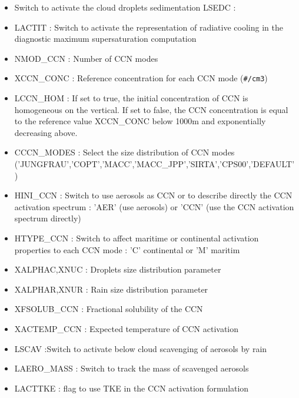\begin{itemize}
\item
{}
Switch to activate the cloud droplets sedimentation
LSEDC : 
\item
{}
LACTIT : Switch to activate the representation of radiative cooling in the diagnostic maximum supersaturation computation
\item
{}
NMOD\_CCN : Number of CCN modes
\item
{}
XCCN\_CONC : Reference concentration for each CCN mode (\verb?#/cm3?)
\item
{}
LCCN\_HOM : If set to true, the initial concentration of CCN is homogeneous on the vertical. If set to false, the CCN concentration is equal to the reference value XCCN\_CONC below 1000m and exponentially decreasing above.
\item
{}
CCCN\_MODES : Select the size distribution of CCN modes ('JUNGFRAU','COPT','MACC','MACC\_JPP','SIRTA','CPS00','DEFAULT')
\item
{}
HINI\_CCN : Switch to use aerosols as CCN or to describe directly the CCN activation spectrum : 'AER' (use aerosols) or 'CCN' (use the CCN activation spectrum directly)
\item
{}
HTYPE\_CCN : Switch to affect maritime or continental activation properties to each CCN mode : 'C' continental or 'M' maritim
\item
{}
XALPHAC,XNUC : Droplets size distribution parameter
\item
{}
XALPHAR,XNUR : Rain size distribution parameter
\item
{}
XFSOLUB\_CCN : Fractional solubility of the CCN
\item
{}
XACTEMP\_CCN : Expected temperature of CCN activation
\item
{}
LSCAV :Switch to activate below cloud scavenging of aerosols by rain
\item
{}
LAERO\_MASS : Switch to track the mass of scavenged aerosols
\item LACTTKE :  flag to use TKE in the CCN activation formulation

\end{itemize}
